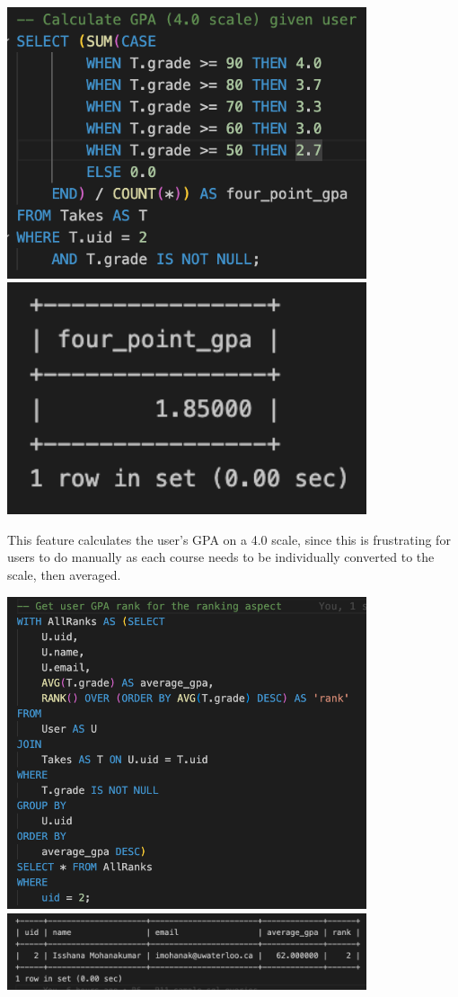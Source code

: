 \documentclass[12pt, a4paper]{article}
\begin{document}
\begin{center}
    \includegraphics[width=400px]{R10/q2}
    \includegraphics[width=400px]{R10/q2out}
\end{center}
This feature calculates the user's GPA on a 4.0 scale, since this is frustrating for users to do manually as each course needs to be individually converted to the scale, then averaged.
\begin{center}
    \includegraphics[width=400px]{R10/q3}
    \includegraphics[width=400px]{R10/q3out}
\end{center}
\end{document}

